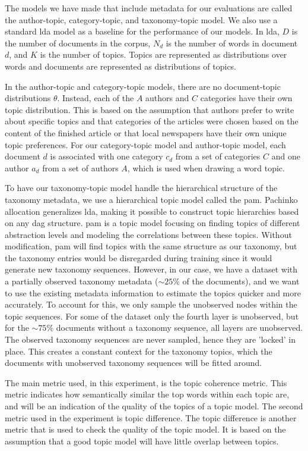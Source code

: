 The models we have made that include metadata for our evaluations are called the author-topic, category-topic, and taxonomy-topic model.
We also use a standard \gls{lda} model as a baseline for the performance of our models.
In \gls{lda}, $D$ is the number of documents in the corpus, $N_d$ is the number of words in document $d$, and $K$ is the number of topics.
Topics are represented as distributions over words and documents are represented as distributions of topics.

In the author-topic and category-topic models, there are no document-topic distributions $\theta$.
Instead, each of the $A$ authors and $C$ categories have their own topic distribution.
This is based on the assumption that authors prefer to write about specific topics and that categories of the articles were chosen based on the content of the finished article or that local newspapers have their own unique topic preferences.
For our category-topic model and author-topic model, each document $d$ is associated with one category $c_d$ from a set of categories $C$ and one author $a_d$ from a set of authors $A$, which is used when drawing a word topic.

To have our taxonomy-topic model handle the hierarchical structure of the taxonomy metadata, we use a hierarchical topic model called the \acrfull{pam}.
Pachinko allocation generalizes \gls{lda}, making it possible to construct topic hierarchies based on any \gls{dag} structure.
\gls{pam} is a topic model focusing on finding topics of different abstraction levels and modeling the correlations between these topics.
Without modification, \gls{pam} will find topics with the same structure as our taxonomy, but the taxonomy entries would be disregarded during training since it would generate new taxonomy sequences.
However, in our case, we have a dataset with a partially observed taxonomy metadata (${\sim}25\%$ of the documents), and we want to use the existing metadata information to estimate the topics quicker and more accurately.
To account for this, we only sample the unobserved nodes within the topic sequences.
For some of the dataset only the fourth layer is unobserved, but for the ${\sim}75\%$ documents without a taxonomy sequence, all layers are unobserved.
The observed taxonomy sequences are never sampled, hence they are 'locked' in place.
This creates a constant context for the taxonomy topics, which the documents with unobserved taxonomy sequences will be fitted around.

The main metric used, in this experiment, is the topic coherence metric.
This metric indicates how semantically similar the top words within each topic are, and will be an indication of the quality of the topics of a topic model.
The second metric used in the experiment is topic difference.
The topic difference is another metric that is used to check the quality of the topic model.
It is based on the assumption that a good topic model will have little overlap between topics.

